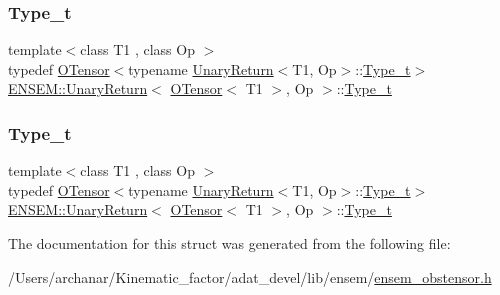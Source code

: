 \subsubsection{\texorpdfstring{Type\_t}{Type\_t}\hspace{0.1cm}{\footnotesize\ttfamily [1/2]}}
{\footnotesize\ttfamily template$<$class T1 , class Op $>$ \\
typedef \mbox{\hyperlink{classENSEM_1_1OTensor}{O\+Tensor}}$<$typename \mbox{\hyperlink{structENSEM_1_1UnaryReturn}{Unary\+Return}}$<$T1, Op$>$\+::\mbox{\hyperlink{structENSEM_1_1UnaryReturn_3_01OTensor_3_01T1_01_4_00_01Op_01_4_a2896ac85d983d41194d2482e3b851bb0}{Type\+\_\+t}}$>$ \mbox{\hyperlink{structENSEM_1_1UnaryReturn}{E\+N\+S\+E\+M\+::\+Unary\+Return}}$<$ \mbox{\hyperlink{classENSEM_1_1OTensor}{O\+Tensor}}$<$ T1 $>$, Op $>$\+::\mbox{\hyperlink{structENSEM_1_1UnaryReturn_3_01OTensor_3_01T1_01_4_00_01Op_01_4_a2896ac85d983d41194d2482e3b851bb0}{Type\+\_\+t}}}

\mbox{\label{structENSEM_1_1UnaryReturn_3_01OTensor_3_01T1_01_4_00_01Op_01_4_a2896ac85d983d41194d2482e3b851bb0}} 
\subsubsection{\texorpdfstring{Type\_t}{Type\_t}\hspace{0.1cm}{\footnotesize\ttfamily [2/2]}}
{\footnotesize\ttfamily template$<$class T1 , class Op $>$ \\
typedef \mbox{\hyperlink{classENSEM_1_1OTensor}{O\+Tensor}}$<$typename \mbox{\hyperlink{structENSEM_1_1UnaryReturn}{Unary\+Return}}$<$T1, Op$>$\+::\mbox{\hyperlink{structENSEM_1_1UnaryReturn_3_01OTensor_3_01T1_01_4_00_01Op_01_4_a2896ac85d983d41194d2482e3b851bb0}{Type\+\_\+t}}$>$ \mbox{\hyperlink{structENSEM_1_1UnaryReturn}{E\+N\+S\+E\+M\+::\+Unary\+Return}}$<$ \mbox{\hyperlink{classENSEM_1_1OTensor}{O\+Tensor}}$<$ T1 $>$, Op $>$\+::\mbox{\hyperlink{structENSEM_1_1UnaryReturn_3_01OTensor_3_01T1_01_4_00_01Op_01_4_a2896ac85d983d41194d2482e3b851bb0}{Type\+\_\+t}}}



The documentation for this struct was generated from the following file\+:\begin{DoxyCompactItemize}
\item 
/\+Users/archanar/\+Kinematic\+\_\+factor/adat\+\_\+devel/lib/ensem/\mbox{\hyperlink{lib_2ensem_2ensem__obstensor_8h}{ensem\+\_\+obstensor.\+h}}\end{DoxyCompactItemize}
